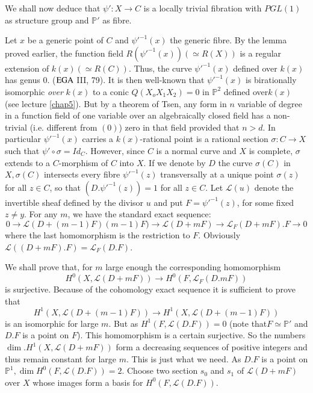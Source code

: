 We shall now deduce that $\psi' : X \to C $ is a locally trivial
fibration with $PGL (1)$ as structure group and $\mathbb{P}'$ as
fibre. 

Let $x$ be a generic point of $C$ and $\psi'^{-1} (x)$ the generic
fibre. By the lemma proved earlier, the function field $R (\psi'^{-1}
(x)) (\simeq R(X))$ is a regular extension of $k(x) (\simeq
R(C))$. Thus, the curve $\psi'^{-1} (x)$ defined over $k(x)$ has genus
$0$. ($\operatorname{EGA}$ III, 79). It is then well-known that $\psi'^{-1} (x)$ is
birationally isomorphic \textit{over} $k(x)$ to a conic $Q(X_oX_1X_2)
= 0$ in $\mathbb{P}^2$ defined over\pageoriginale $k(x)$ (see lecture
\ref{chap5}). But by a 
theorem of Tsen, any form in $n$ variable of degree in a function field
of one variable over an algebraically closed field has a non-trivial
(i.e. different from $(0)$) zero in that field provided that $n>d$. In
particular $\psi'^{-1} (x)$ carries a $k(x)$-rational point is a
rational section $\sigma:C \to X$ such that
$\psi' \circ \sigma=Id_C$. However, since $C$ is a normal curve and $X$ is
complete, $\sigma$  extends to a $C$-morphism of $C$ into $X$. If we
denote by $D$ the curve $\sigma (C)$ in $X,\sigma(C)$ intersects every
fibre $\psi'^{-1}(z)$ transversally at a unique point $\sigma(z)$ for
all $z \in C$, so that $(D. \psi'^{-1}(z))=1$ for all $z \in C$. Let
$\mathcal{L}(u)$ denote the invertible sheaf defined by the divisor
$u$ and put $F=\psi'^{-1}(z)$, for some fixed $z \neq y$. For any $m$,
we have the standard exact sequence: 
$$
0 \to \mathscr{L}(D+(m-1)F)(m-1)F) \to \mathscr{L}(D+mF)\to
\mathscr{L}_F (D+mF). F\to 0 
$$ 
where the last homomorphism is the restriction to $F$. Obviously
$\mathscr{L}((D+mF).F)=\mathscr{L}_F(D.F)$. 

We shall prove that, for $m$ large enough the corresponding homomorphism
$$
H^0(X,\mathscr{L}(D+mF))\to H^0(F,\mathscr{L}_F(D.mF))
$$  
is surjective. Because of the cohomology exact sequence it is sufficient
to prove that 
$$
H^1(X,\mathscr{L}(D+(m-1)F))\to H^1(X,\mathscr{L}(D+(m-1)F))
$$ 
is an isomorphic for large $m$. But as $H^1(F,\mathscr{L}(D.F))=0$
(note that\pageoriginale $F \simeq \mathbb{P}'$ and $D.F$ is a point
on $F$). This 
homomorphism is a certain surjective. So the numbers
$\dim.H^1(X,\mathscr{L}(D+mF))$ form a decreasing sequences of
positive integers and thus remain constant for large $m$. This is just
what we need. As $D.F$ is a point on $\mathbb{P}^1,\dim
H^0(F,\mathscr{L}(D.F))=2$. Choose two section $s_0$ and $s_1$ of
$\mathscr{L}(D+mF)$ over $X$ whose images form a basis for
$H^0(F,\mathscr{L}(D.F))$. 

